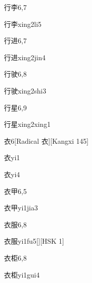\begin{entry}{行李}{6,7}
  \begin{phonetics}{行李}{xing2li5}
  \end{phonetics}
\end{entry}

\begin{entry}{行进}{6,7}
  \begin{phonetics}{行进}{xing2jin4}
  \end{phonetics}
\end{entry}

\begin{entry}{行驶}{6,8}
  \begin{phonetics}{行驶}{xing2shi3}
  \end{phonetics}
\end{entry}

\begin{entry}{行星}{6,9}
  \begin{phonetics}{行星}{xing2xing1}
  \end{phonetics}
\end{entry}

\begin{entry}{衣}{6}[Radical 衣][Kangxi 145]
  \begin{phonetics}{衣}{yi1}
  \end{phonetics}
  \begin{phonetics}{衣}{yi4}
  \end{phonetics}
\end{entry}

\begin{entry}{衣甲}{6,5}
  \begin{phonetics}{衣甲}{yi1jia3}
  \end{phonetics}
\end{entry}

\begin{entry}{衣服}{6,8}
  \begin{phonetics}{衣服}{yi1fu5}[][HSK 1]
  \end{phonetics}
\end{entry}

\begin{entry}{衣柜}{6,8}
  \begin{phonetics}{衣柜}{yi1gui4}
  \end{phonetics}
\end{entry}


